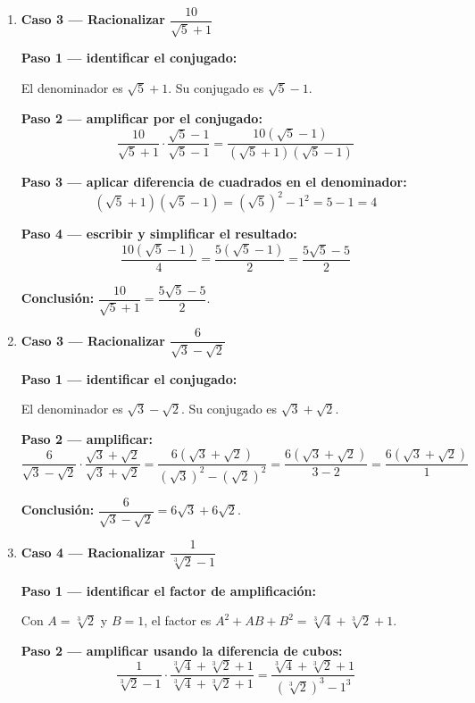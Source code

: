 \documentclass[11pt, letterpaper]{article}
\begin{document}
\begin{tcolorbox}[examplebox, title={Ejemplos}]
\begin{enumerate}[label=\textbf{Ej. \arabic*.}, leftmargin=*, itemsep=18pt]
\textbf{Conclusión:} $\dfrac{24}{\sqrt[3]{2}} = 12\sqrt[3]{4}$.

\item \textbf{Caso 3 — Racionalizar $\dfrac{10}{\sqrt{5}+1}$}

\textbf{Paso 1 — identificar el conjugado:}

El denominador es $\sqrt{5}+1$. Su conjugado es $\sqrt{5}-1$.

\textbf{Paso 2 — amplificar por el conjugado:}
$$\frac{10}{\sqrt{5}+1} \cdot \frac{\sqrt{5}-1}{\sqrt{5}-1} = \frac{10(\sqrt{5}-1)}{(\sqrt{5}+1)(\sqrt{5}-1)}$$

\textbf{Paso 3 — aplicar diferencia de cuadrados en el denominador:}
$$(\sqrt{5}+1)(\sqrt{5}-1) = (\sqrt{5})^2 - 1^2 = 5 - 1 = 4$$

\textbf{Paso 4 — escribir y simplificar el resultado:}
$$\frac{10(\sqrt{5}-1)}{4} = \frac{5(\sqrt{5}-1)}{2} = \frac{5\sqrt{5}-5}{2}$$

\textbf{Conclusión:} $\dfrac{10}{\sqrt{5}+1} = \dfrac{5\sqrt{5}-5}{2}$.

\item \textbf{Caso 3 — Racionalizar $\dfrac{6}{\sqrt{3}-\sqrt{2}}$}

\textbf{Paso 1 — identificar el conjugado:}

El denominador es $\sqrt{3}-\sqrt{2}$. Su conjugado es $\sqrt{3}+\sqrt{2}$.

\textbf{Paso 2 — amplificar:}
$$\frac{6}{\sqrt{3}-\sqrt{2}} \cdot \frac{\sqrt{3}+\sqrt{2}}{\sqrt{3}+\sqrt{2}} = \frac{6(\sqrt{3}+\sqrt{2})}{(\sqrt{3})^2-(\sqrt{2})^2} = \frac{6(\sqrt{3}+\sqrt{2})}{3-2} = \frac{6(\sqrt{3}+\sqrt{2})}{1}$$

\textbf{Conclusión:} $\dfrac{6}{\sqrt{3}-\sqrt{2}} = 6\sqrt{3}+6\sqrt{2}$.

\item \textbf{Caso 4 — Racionalizar $\dfrac{1}{\sqrt[3]{2}-1}$}

\textbf{Paso 1 — identificar el factor de amplificación:}

Con $A = \sqrt[3]{2}$ y $B = 1$, el factor es $A^2 + AB + B^2 = \sqrt[3]{4} + \sqrt[3]{2} + 1$.

\textbf{Paso 2 — amplificar usando la diferencia de cubos:}
$$\frac{1}{\sqrt[3]{2}-1} \cdot \frac{\sqrt[3]{4}+\sqrt[3]{2}+1}{\sqrt[3]{4}+\sqrt[3]{2}+1} = \frac{\sqrt[3]{4}+\sqrt[3]{2}+1}{(\sqrt[3]{2})^3 - 1^3}$$


\end{enumerate}
\end{tcolorbox}
\end{document}
